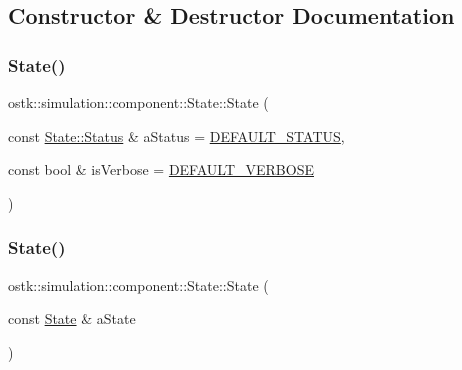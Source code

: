 \subsection{Constructor \& Destructor Documentation}
\mbox{\label{classostk_1_1simulation_1_1component_1_1_state_aef1526b3513a2165970420e7ac8b6dae}} 
\subsubsection{\texorpdfstring{State()}{State()}\hspace{0.1cm}{\footnotesize\ttfamily [1/2]}}
{\footnotesize\ttfamily ostk\+::simulation\+::component\+::\+State\+::\+State (\begin{DoxyParamCaption}\item[{const \hyperlink{classostk_1_1simulation_1_1component_1_1_state_adb8b51feaa29b0ebd5fc7977fada7e58}{State\+::\+Status} \&}]{a\+Status = {\ttfamily \hyperlink{_state_8hpp_a188ce67e515b427589d4c363d1132018}{D\+E\+F\+A\+U\+L\+T\+\_\+\+S\+T\+A\+T\+US}},  }\item[{const bool \&}]{is\+Verbose = {\ttfamily \hyperlink{_state_8hpp_a4ad8faebfc1723fec1090b84ec0f680e}{D\+E\+F\+A\+U\+L\+T\+\_\+\+V\+E\+R\+B\+O\+SE}} }\end{DoxyParamCaption})}

\mbox{\label{classostk_1_1simulation_1_1component_1_1_state_a36adbe9bccb78bec881e2c3f267724ed}} 
\subsubsection{\texorpdfstring{State()}{State()}\hspace{0.1cm}{\footnotesize\ttfamily [2/2]}}
{\footnotesize\ttfamily ostk\+::simulation\+::component\+::\+State\+::\+State (\begin{DoxyParamCaption}\item[{const \hyperlink{classostk_1_1simulation_1_1component_1_1_state}{State} \&}]{a\+State }\end{DoxyParamCaption})}


